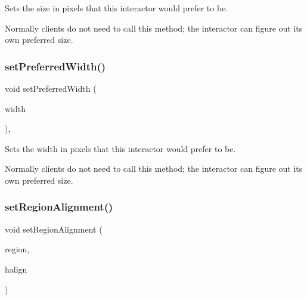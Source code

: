 Sets the size in pixels that this interactor would prefer to be. 

Normally clients do not need to call this method; the interactor can figure out its own preferred size. \mbox{\label{classsgl_1_1GInteractor_a3db429ab2fa52efd187eec0ed8cdd9f2}} 
\subsubsection{\texorpdfstring{set\+Preferred\+Width()}{setPreferredWidth()}}
{\footnotesize\ttfamily void set\+Preferred\+Width (\begin{DoxyParamCaption}\item[{double}]{width }\end{DoxyParamCaption})\hspace{0.3cm}{\ttfamily [virtual]}, {\ttfamily [inherited]}}



Sets the width in pixels that this interactor would prefer to be. 

Normally clients do not need to call this method; the interactor can figure out its own preferred size. \mbox{\label{classsgl_1_1GContainer_a96e9f5593c0193bbdc7ae99945b9cf5f}} 
\subsubsection{\texorpdfstring{set\+Region\+Alignment()}{setRegionAlignment()}\hspace{0.1cm}{\footnotesize\ttfamily [1/5]}}
{\footnotesize\ttfamily void set\+Region\+Alignment (\begin{DoxyParamCaption}\item[{\mbox{\hyperlink{classsgl_1_1GContainer_a81a01a86de31071a92e6cce0bab9bc4b}{Region}}}]{region,  }\item[{\mbox{\hyperlink{namespacesgl_aa00e70829e72ff16addc4d9f06fe3bc5}{Horizontal\+Alignment}}}]{halign }\end{DoxyParamCaption})\hspace{0.3cm}{\ttfamily [virtual]}}



